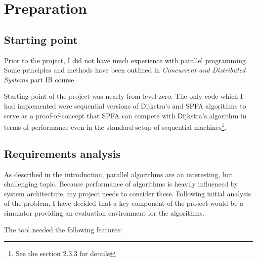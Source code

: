 \documentclass[12pt,a4paper,oneside,openright]{report}
\begin{document}
\chapter{Preparation}
\section{Starting point}
Prior to the project, I did not have much experience with parallel programming. Some principles and methods have been outlined in \textit{Concurrent and Distributed Systems} part IB course.

Starting point of the project was nearly from level zero. The only code which I had implemented were sequential versions of Dijkstra's and SPFA algorithms to serve as a proof-of-concept that SPFA can compete with Dijkstra's algorithm in terms of performance even in the standard setup of sequential machines\footnote{See the section $2.3.3$ for details}.

\section{Requirements analysis}
As described in the introduction, parallel algorithms are an interesting, but challenging topic. Because performance of algorithms is heavily influenced by system architecture, my project needs to consider these. Following initial analysis of the problem, I have decided that a key component of the project would be a simulator providing an evaluation environment for the algorithms.

The tool needed the following features:
\end{document}
